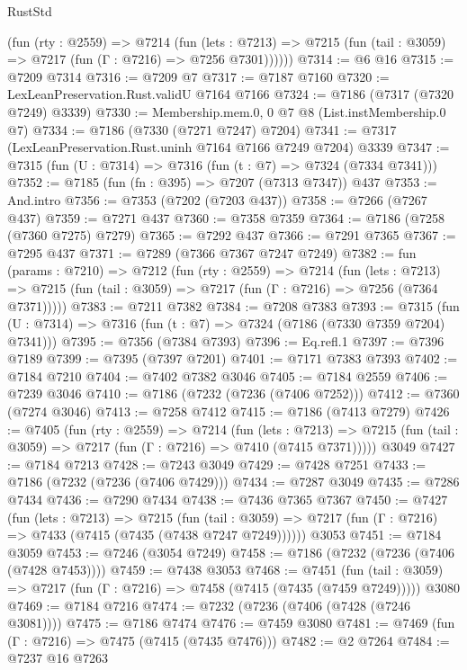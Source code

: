 \begin{lexlean}{RustStd}
\begin{coremodule}
{\begin{coremodule}
{{{{{{{{{{{{{{{{{{{{{{{{{{{{{{{{        (fun (rty : @2559) =>
        @7214
          (fun (lets : @7213) =>
          @7215 (fun (tail : @3059) => @7217 (fun (Γ : @7216) => @7256 @7301))))))
@7314 := @6 @16
@7315 := @7209 @7314
@7316 := @7209 @7
@7317 := @7187 @7160
@7320 := LexLeanPreservation.Rust.validU @7164 @7166
@7324 := @7186 (@7317 (@7320 @7249) @3339)
@7330 := Membership.mem.{0, 0} @7 @8 (List.instMembership.{0} @7)
@7334 := @7186 (@7330 (@7271 @7247) @7204)
@7341 := @7317 (LexLeanPreservation.Rust.uninh @7164 @7166 @7249 @7204) @3339
@7347 := @7315 (fun (U : @7314) => @7316 (fun (t : @7) => @7324 (@7334 @7341)))
@7352 := @7185 (fun (fn : @395) => @7207 (@7313 @7347)) @437
@7353 := And.intro
@7356 := @7353 (@7202 (@7203 @437))
@7358 := @7266 (@7267 @437)
@7359 := @7271 @437
@7360 := @7358 @7359
@7364 := @7186 (@7258 (@7360 @7275) @7279)
@7365 := @7292 @437
@7366 := @7291 @7365
@7367 := @7295 @437
@7371 := @7289 (@7366 @7367 @7247 @7249)
@7382 := fun (params : @7210) =>
  @7212
    (fun (rty : @2559) =>
    @7214
      (fun (lets : @7213) =>
      @7215 (fun (tail : @3059) => @7217 (fun (Γ : @7216) => @7256 (@7364 @7371)))))
@7383 := @7211 @7382
@7384 := @7208 @7383
@7393 := @7315 (fun (U : @7314) => @7316 (fun (t : @7) => @7324 (@7186 (@7330 @7359 @7204) @7341)))
@7395 := @7356 (@7384 @7393)
@7396 := Eq.refl.{1}
@7397 := @7396 @7189
@7399 := @7395 (@7397 @7201)
@7401 := @7171 @7383 @7393
@7402 := @7184 @7210
@7404 := @7402 @7382 @3046
@7405 := @7184 @2559
@7406 := @7239 @3046
@7410 := @7186 (@7232 (@7236 (@7406 @7252)))
@7412 := @7360 (@7274 @3046)
@7413 := @7258 @7412
@7415 := @7186 (@7413 @7279)
@7426 := @7405
    (fun (rty : @2559) =>
    @7214
      (fun (lets : @7213) =>
      @7215 (fun (tail : @3059) => @7217 (fun (Γ : @7216) => @7410 (@7415 @7371)))))
    @3049
@7427 := @7184 @7213
@7428 := @7243 @3049
@7429 := @7428 @7251
@7433 := @7186 (@7232 (@7236 (@7406 @7429)))
@7434 := @7287 @3049
@7435 := @7286 @7434
@7436 := @7290 @7434
@7438 := @7436 @7365 @7367
@7450 := @7427
    (fun (lets : @7213) =>
    @7215
      (fun (tail : @3059) => @7217 (fun (Γ : @7216) => @7433 (@7415 (@7435 (@7438 @7247 @7249))))))
    @3053
@7451 := @7184 @3059
@7453 := @7246 (@3054 @7249)
@7458 := @7186 (@7232 (@7236 (@7406 (@7428 @7453))))
@7459 := @7438 @3053
@7468 := @7451
    (fun (tail : @3059) => @7217 (fun (Γ : @7216) => @7458 (@7415 (@7435 (@7459 @7249)))))
    @3080
@7469 := @7184 @7216
@7474 := @7232 (@7236 (@7406 (@7428 (@7246 @3081))))
@7475 := @7186 @7474
@7476 := @7459 @3080
@7481 := @7469 (fun (Γ : @7216) => @7475 (@7415 (@7435 @7476)))
@7482 := @2 @7264
@7484 := @7237 @16 @7263
}}}}}}}}}}}}}}}}}}}}}}}}}}}}}}}}
\end{coremodule}}
\end{coremodule}
\end{lexlean}
